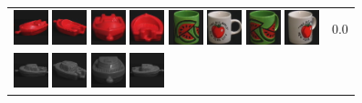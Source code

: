 \begin{figure}[bp]
\begin{tabular}{m{11cm} | m{3cm} |}
\includegraphics[width=1cm]{coil/beeld-21.eps}
\includegraphics[width=1cm]{coil/beeld-22.eps}
\includegraphics[width=1cm]{coil/beeld-20.eps}
\includegraphics[width=1cm]{coil/beeld-23.eps}
\includegraphics[width=1cm]{coil/beeld-32.eps}
\includegraphics[width=1cm]{coil/beeld-36.eps}
\includegraphics[width=1cm]{coil/beeld-33.eps}
\includegraphics[width=1cm]{coil/beeld-39.eps}
& {\scriptsize 0.0}
\\
\includegraphics[width=1cm]{coil/beeld-24.eps}
\includegraphics[width=1cm]{coil/beeld-25.eps}
\includegraphics[width=1cm]{coil/beeld-28.eps}
\includegraphics[width=1cm]{coil/beeld-27.eps}

\end{tabular}
\end{figure}
